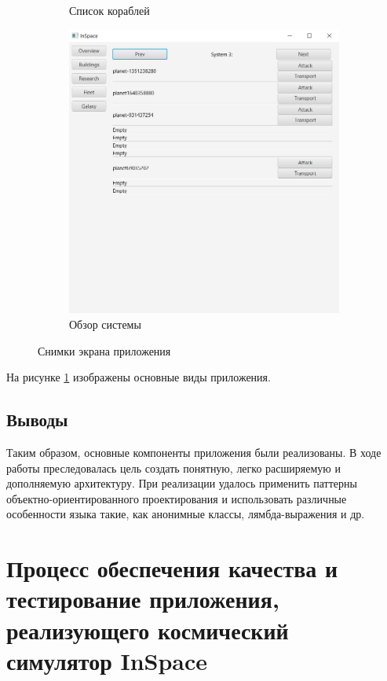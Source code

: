 \begin{figure}[H]
\begin{subfigure}[b]{0.4\textwidth}
\caption{Список кораблей}
\end{subfigure}
\begin{subfigure}[b]{0.4\textwidth} 
\includegraphics[width=1\textwidth]{../screenshots/5.png}
\caption{Обзор системы}
\end{subfigure}
\caption{Снимки экрана приложения}
\label{pic:gui}
\end{figure} 

 На рисунке \ref{pic:gui} изображены основные виды приложения.


  

\subsection{Выводы}
Таким образом, основные компоненты приложения были реализованы. В ходе работы преследовалась цель создать понятную, легко расширяемую и дополняемую архитектуру. При реализации удалось применить паттерны объектно-ориентированного проектирования и использовать различные особенности языка такие, как анонимные классы, лямбда-выражения и др. 
   
\section{Процесс обеспечения качества и тестирование приложения, реализующего космический симулятор InSpace}

